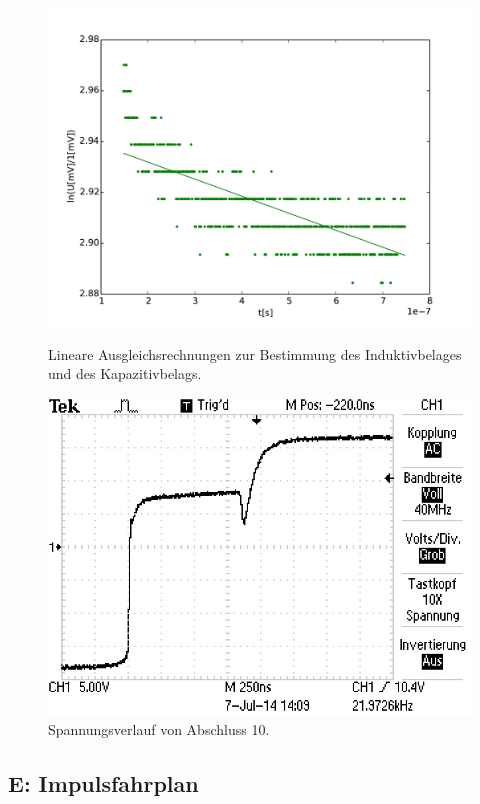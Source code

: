 \begin{figure}
	\centering
	\includegraphics[width = 14cm]{data/d/Regression3.pdf}
	\caption{Lineare Ausgleichsrechnungen zur Bestimmung des Induktivbelages und des Kapazitivbelags.}
	\includegraphics[width = 12cm]{data/d/F0007TEK.JPG}
	\caption{Spannungsverlauf von Abschluss 10.}
	\label{fig_abs10}
\end{figure}

\FloatBarrier
\subsection{E: Impulsfahrplan} %
\label{sub:subsection_name}

